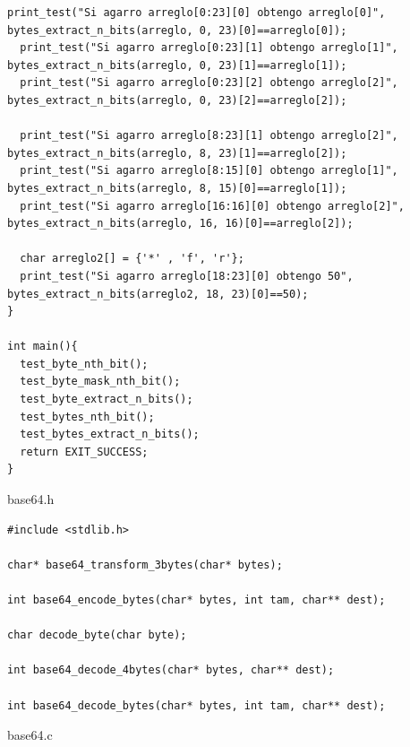 \documentclass[11pt]{article}
\begin{document}
\begin{lstlisting}[style=Cstyle]
  print_test("Si agarro arreglo[0:23][0] obtengo arreglo[0]", bytes_extract_n_bits(arreglo, 0, 23)[0]==arreglo[0]);
  print_test("Si agarro arreglo[0:23][1] obtengo arreglo[1]", bytes_extract_n_bits(arreglo, 0, 23)[1]==arreglo[1]);
  print_test("Si agarro arreglo[0:23][2] obtengo arreglo[2]", bytes_extract_n_bits(arreglo, 0, 23)[2]==arreglo[2]);

  print_test("Si agarro arreglo[8:23][1] obtengo arreglo[2]", bytes_extract_n_bits(arreglo, 8, 23)[1]==arreglo[2]);
  print_test("Si agarro arreglo[8:15][0] obtengo arreglo[1]", bytes_extract_n_bits(arreglo, 8, 15)[0]==arreglo[1]);
  print_test("Si agarro arreglo[16:16][0] obtengo arreglo[2]", bytes_extract_n_bits(arreglo, 16, 16)[0]==arreglo[2]);

  char arreglo2[] = {'*' , 'f', 'r'};
  print_test("Si agarro arreglo[18:23][0] obtengo 50", bytes_extract_n_bits(arreglo2, 18, 23)[0]==50);
}

int main(){
  test_byte_nth_bit();
  test_byte_mask_nth_bit();
  test_byte_extract_n_bits();
  test_bytes_nth_bit();
  test_bytes_extract_n_bits();
  return EXIT_SUCCESS;
}    \end{lstlisting}
    base64.h
    \begin{lstlisting}[style=Cstyle]
#include <stdlib.h>

char* base64_transform_3bytes(char* bytes);

int base64_encode_bytes(char* bytes, int tam, char** dest);

char decode_byte(char byte);

int base64_decode_4bytes(char* bytes, char** dest);

int base64_decode_bytes(char* bytes, int tam, char** dest);\end{lstlisting}
    \newpage
    base64.c
\end{document}
